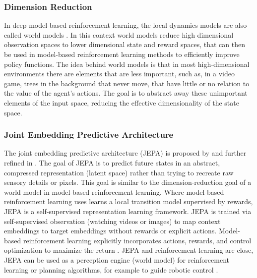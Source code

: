 \subsubsection{Dimension Reduction}
In deep model-based reinforcement learning, the local dynamics  models  are also called world models \citep{ha2018world}. 
In this context world models reduce high dimensional observation spaces to lower dimensional state and reward spaces, that can then be used in model-based reinforcement learning methods to efficiently improve policy functions. 
The idea
behind world models is that in most high-dimensional environments
there are elements that are less important, such as, in a video game, trees in the  background 
that never move,  that have little or no relation to the value
of the agent's actions. The goal  is to
abstract away these  unimportant elements of the input space, 
reducing the effective dimensionality of the state space.

\subsubsection{Joint Embedding Predictive Architecture}
The joint embedding predictive architecture (JEPA) is proposed by \citet{lecun2022path} and further refined in \citet{assran2023self}. The goal of JEPA is to predict future states in an abstract, compressed representation (latent space) rather than trying to recreate raw sensory details or pixels. This goal is similar to the dimension-reduction goal of a world model in model-based reinforcement learning. Where model-based reinforcement learning uses learns a local transition model supervised by rewards, JEPA is a self-supervised representation learning framework. 
JEPA is trained  via self-supervised observation (watching videos or images) to map context embeddings to target embeddings without rewards or explicit actions. Model-based reinforcement learning explicitly incorporates actions, rewards, and control optimization to maximize the return \citep{lim2026jedi}. JEPA and reinforcement learning are close, JEPA can be used as a perception engine (world model) for reinforcement learning or planning algorithms, for example to guide robotic control \citep{destrade2025value}.


